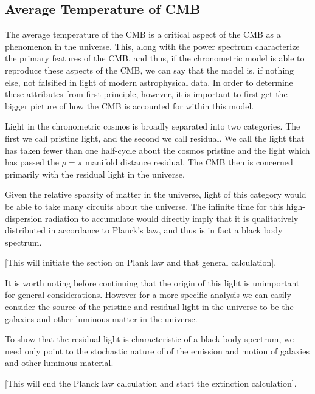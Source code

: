 \documentclass[a4paper]{article}
\begin{document}
\subsection{Average Temperature of CMB}
    
    The average temperature of the CMB is a critical aspect of the CMB as a
    phenomenon in the universe. This, along with the power spectrum characterize
    the primary features of the CMB, and thus, if the chronometric model is able to
    reproduce these aspects of the CMB, we can say that the model is, if nothing
    else, not falsified in light of modern astrophysical data. In order to
    determine these attributes from first principle, however, it is important to
    first get the bigger picture of how the CMB is accounted for within this model.
    
    Light in the chronometric cosmos is broadly separated into two categories. The
    first we call pristine light, and the second we call residual. We call the
    light that has taken fewer than one half-cycle about the cosmos pristine and
    the light which has passed the $\rho = \pi$ manifold distance residual. The CMB
    then is concerned primarily with the residual light in the universe. 
    
    Given the relative sparsity of matter in the universe, light of this category
    would be able to take many circuits about the universe. The infinite time for
    this high-dispersion radiation to accumulate would directly imply that it is
    qualitatively distributed in accordance to Planck’s law, and thus is in fact a
    black body spectrum.  
    
    \begin{center}
        [This will initiate the section on Plank law and that general
        calculation].  
    \end{center}
    
    It is worth noting before continuing that the origin of this light is
    unimportant for general considerations.  However for a more specific analysis
    we can easily consider the source of the pristine and residual  light in the
    universe to be the galaxies and other luminous matter in the universe. 
    
    To show that the residual light is characteristic of a black body spectrum, we
    need only point to the stochastic nature of of the emission and motion of
    galaxies and other luminous material.

    \begin{center}
        [This will end the Planck law calculation and start the extinction
        calculation]. 
    \end{center}
\end{document}
